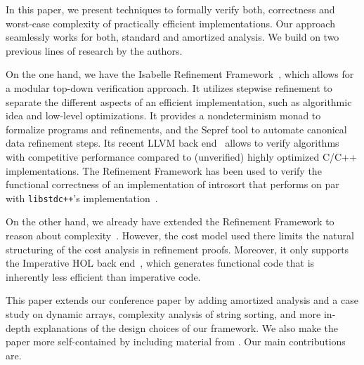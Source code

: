 \documentclass[acmsmall]{acmart}
\newcommand{\is}{\lstinline[language=isabelle]}
\begin{document}
In this paper, we present techniques to formally verify both, correctness and worst-case complexity of practically efficient implementations.
Our approach seamlessly works for both, standard and amortized analysis.
We build on two previous lines of research by the authors. 

On the one hand, we have the Isabelle Refinement Framework~\cite{lammich2012applying}, which allows for a modular top-down verification approach. It utilizes stepwise refinement to separate the different aspects of an efficient implementation, such as algorithmic idea and low-level optimizations. 
It provides a nondeterminism monad to formalize programs and refinements, and the Sepref tool to automate canonical data refinement steps.
Its recent LLVM back end~\cite{lammich2019LLVM} allows to verify algorithms with competitive performance compared to (unverified) highly optimized C/C++ implementations. 
The Refinement Framework has been used to verify the functional correctness of an implementation of introsort that performs on par with \is{libstdc++}'s implementation~\cite{Lammich20}.

On the other hand, we already have extended the Refinement Framework to reason about complexity~\cite{HaslbeckL19}.
However, the cost model used there limits the natural structuring of the cost analysis in refinement proofs. Moreover, it only supports the Imperative HOL back end~\cite{Lammich19_JAR}, which generates functional code that is inherently less efficient than imperative code.

This paper extends our conference paper \cite{HaslbeckL21} by adding amortized analysis and a case study on dynamic arrays, complexity analysis of string sorting, and more in-depth explanations of the design choices of our framework. We also make the paper more self-contained by including material from \cite{HaslbeckL19}.
Our main contributions are.
\end{document}
